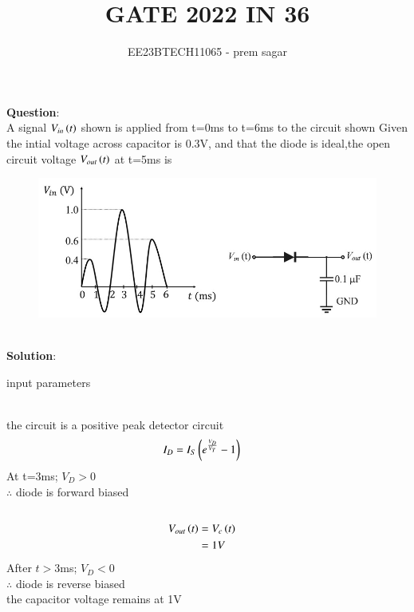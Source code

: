 \documentclass[journal,12pt,twocolumn]{IEEEtran}
\theoremstyle{remark}
\begin{document}

\vspace{3cm}

\title{GATE 2022 IN 36}
\author{EE23BTECH11065 - prem sagar}
\maketitle
\newpage

\bigskip

\renewcommand{\thefigure}{\theenumi}
\renewcommand{\thetable}{\theenumi}
\textbf{Question}:
\\A signal $V_{in}\left(t\right)$ shown is applied from t=0ms to t=6ms to the circuit shown Given the intial voltage across capacitor is 0.3V, and that the diode is ideal,the open circuit voltage $V_{out}\left(t\right)$ at t=5ms is
\begin{figure}[h]
\renewcommand\thefigure{1}
    \centering
    \includegraphics[width=1\linewidth]{figs/figuree.png}
    \caption{ }
\end{figure}
\\\textbf{Solution}:
\begin{table}[!ht]
\def\arraystretch{1.5}
   \centering
    \renewcommand\thetable{1}
      
    \caption{input parameters}
    \label{tab:IN 14}
 \end{table}
\\ the circuit is a positive peak detector circuit  
\begin{align}
I_D&=I_S\left(e^\frac{V_D}{V_T}-1\right)
\end{align}
At t=3ms; $V_D>0$
\\$\therefore$ diode is forward biased
\begin{align}
\\V_{out}\left(t\right)&=V_c\left(t\right)
\\&=1V
\end{align}
After $t>3$ms; $V_D<0$
\\$\therefore$ diode is reverse biased
\\the capacitor voltage remains at 1V  
\end{document}
